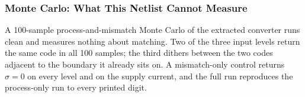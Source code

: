 %

\subsubsection{Monte Carlo: What This Netlist Cannot Measure}\label{sss:adc-mc}

A 100-sample process-and-mismatch Monte Carlo of the extracted converter runs
clean and measures nothing about matching. Two of the three input levels return
the same code in all 100 samples; the third dithers between the two codes
adjacent to the boundary it already sits on. A mismatch-only control returns
\(\sigma = 0\) on every level and on the supply current, and the full run
reproduces the process-only run to every printed digit.

